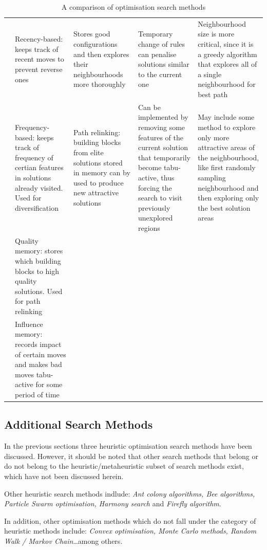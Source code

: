 \begin{table}
{\begin{tabular}[h]{|p{1cm}| p{}p{}p{}p{}|}
 &Recency-based: keeps track of recent moves to prevent reverse ones&Stores good configurations and then explores their neighbourhoods more thoroughly&Temporary change of rules can penalise solutions similar to the current one&Neighbourhood size is more critical, since it is a greedy algorithm that explores all of a single neighbourhood for best path\\
 &Frequency-based: keeps track of frequency of certian features in solutions already visited. Used for diversification&Path relinking: building blocks from elite solutions stored in memory can by used to produce new attractive solutions&Can be implemented by removing some features of the current solution that temporarily become tabu-active, thus forcing the search to visit previously unexplored regions&May include some method to explore only more attractive areas of the neighbourhood, like first randomly sampling neighbourhood and then exploring only the best solution areas\\
 &Quality memory: stores which building blocks to high quality solutions. Used for path relinking& & & \\
 &Influence memory: records impact of certain moves and makes bad moves tabu-active for some period of time& & & \\\hline
\end{tabular}}
\caption[Optimisation Search Method Characteristics]{A comparison of optimisation search methods \cite{caldas01}}
\label{tab:OptCmp}
\end{table}

\clearpage
\subsection{Additional Search Methods}

In the previous sections three heuristic optimisation search methods have been discussed. However, it should be noted that other search methods that belong or do not belong to the heuristic/metaheuristic subset of search methods exist, which have not been discussed herein.

Other heuristic search methods indlude: \emph{Ant colony algorithms, Bee algorithms, Particle Swarm optimisation, Harmony search} and \emph{Firefly algorithm}.

In addition, other optimisation methods which do not fall under the category of heuristic methods include: \emph{Convex optimisation, Monte Carlo methods, Random Walk / Markov Chain}\ldots among others.

